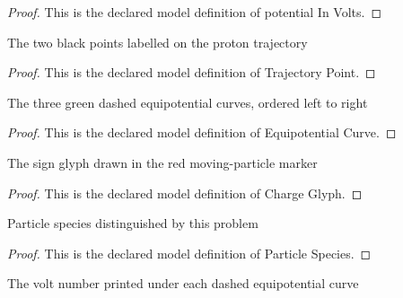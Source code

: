 \begin{proof}
  This is the declared model definition of potential In Volts.
\end{proof}
\begin{definition}
  \label{def:physics:phyx-mini-0865:phyxminiproblems-problemphyxmini0865-trajectorypoint}
  The two black points labelled on the proton trajectory
\end{definition}
\begin{proof}
  This is the declared model definition of Trajectory Point.
\end{proof}
\begin{definition}
  \label{def:physics:phyx-mini-0865:phyxminiproblems-problemphyxmini0865-equipotentialcurve}
  The three green dashed equipotential curves, ordered left to right
\end{definition}
\begin{proof}
  This is the declared model definition of Equipotential Curve.
\end{proof}
\begin{definition}
  \label{def:physics:phyx-mini-0865:phyxminiproblems-problemphyxmini0865-chargeglyph}
  The sign glyph drawn in the red moving-particle marker
\end{definition}
\begin{proof}
  This is the declared model definition of Charge Glyph.
\end{proof}
\begin{definition}
  \label{def:physics:phyx-mini-0865:phyxminiproblems-problemphyxmini0865-particlespecies}
  Particle species distinguished by this problem
\end{definition}
\begin{proof}
  This is the declared model definition of Particle Species.
\end{proof}
\begin{definition}
  \label{def:physics:phyx-mini-0865:phyxminiproblems-problemphyxmini0865-displayedpotentialinvolts}
  The volt number printed under each dashed equipotential curve
\end{definition}
